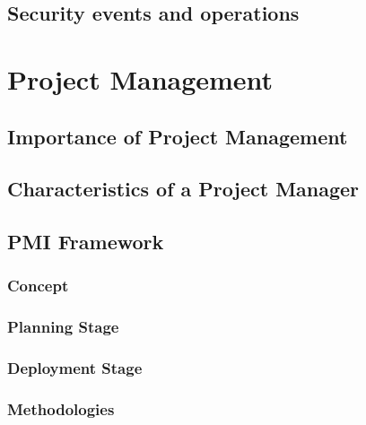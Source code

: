 \hypertarget{security-events-and-operations}{%
\section{Security events and
operations}\label{security-events-and-operations}}

\hypertarget{project-management}{%
\chapter{Project Management}\label{project-management}}

\hypertarget{importance-of-project-management}{%
\section{Importance of Project
Management}\label{importance-of-project-management}}

\hypertarget{characteristics-of-a-project-manager}{%
\section{Characteristics of a Project
Manager}\label{characteristics-of-a-project-manager}}

\hypertarget{pmi-framework}{%
\section{PMI Framework}\label{pmi-framework}}

\hypertarget{concept}{%
\subsection{Concept}\label{concept}}

\hypertarget{planning-stage}{%
\subsection{Planning Stage}\label{planning-stage}}

\hypertarget{deployment-stage}{%
\subsection{Deployment Stage}\label{deployment-stage}}

\hypertarget{methodologies}{%
\subsection{Methodologies}\label{methodologies}}

